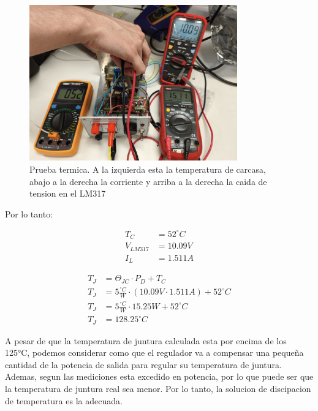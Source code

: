 \documentclass[chaptersright]{informeutn}
\begin{document}
        \begin{figure}[h!]
          \centering
          \includegraphics[width=0.8\textwidth]{pictures/reg_prueb-term.jpeg}
          \caption{Prueba termica. A la izquierda esta la temperatura de carcasa, abajo a la derecha la corriente y
                   arriba a la derecha la caida de tension en el LM317}
        \end{figure}

        Por lo tanto:
        \begin{figure}[h]
          \centering
          \begin{minipage}{0.4\textwidth}
            \begin{align*}
              T_C &= 52^\circ C\\[6pt]
              V_{LM317} &= 10.09V\\[6pt]
              I_L &= 1.511A
            \end{align*}
          \end{minipage}
          \begin{minipage}{0.4\textwidth}
            \begin{align*}
              T_J &= \Theta_{JC} \cdot P_D + T_C\\[6pt]
              T_J &= 5\frac{^\circ C}{W} \cdot (10.09V \cdot 1.511A) + 52^\circ C\\[6pt]
              T_J &= 5\frac{^\circ C}{W} \cdot 15.25W + 52^\circ C\\[6pt]
              T_J &= 128.25^\circ C
            \end{align*}
          \end{minipage}
        \end{figure}

        A pesar de que la temperatura de juntura calculada esta por encima de los 125°C, podemos considerar como que
        el regulador va a compensar una pequeña cantidad de la potencia de salida para regular su temperatura de
        juntura. Ademas, segun las mediciones esta excedido en potencia, por lo que puede ser que la temperatura de
        juntura real sea menor. Por lo tanto, la solucion de discipacion de temperatura es la adecuada.
\end{document}
